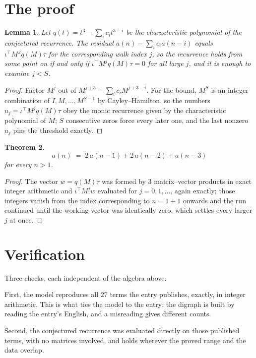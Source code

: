 \documentclass[11pt,a4paper]{article}
\theoremstyle{plain}
\newtheorem{theorem}{Theorem}
\newtheorem{lemma}[theorem]{Lemma}
\theoremstyle{definition}
\begin{document}
\section{The proof}

\begin{lemma}\label{lem:crit}
Let $q(t)=t^{3}-\sum_i c_it^{3-i}$ be the characteristic polynomial of the
conjectured recurrence. The residual $a(n)-\sum_ic_ia(n-i)$ equals
$\iota^{\!\top}M^{\,j}q(M)\tau$ for the corresponding walk index $j$, so the recurrence
holds from some point on if and only if $\iota^{\!\top}M^{j}q(M)\tau=0$ for all large $j$,
and it is enough to examine $j<S$.
\end{lemma}

\begin{proof}
Factor $M^{j}$ out of $M^{j+3}-\sum_ic_iM^{j+3-i}$. For the bound, $M^{S}$
is an integer combination of $I,M,\dots,M^{S-1}$ by Cayley--Hamilton, so the numbers
$u_j=\iota^{\!\top}M^{j}q(M)\tau$ obey the monic recurrence given by the characteristic
polynomial of $M$; $S$ consecutive zeros force every later one, and the last nonzero $u_j$
pins the threshold exactly.
\end{proof}

\begin{theorem}
\[
a(n)\;=\;2\,a(n-1) + 2\,a(n-2) + a(n-3)
\]
for every $n>1$.
\end{theorem}

\begin{proof}
The vector $w=q(M)\tau$ was formed by $3$ matrix--vector products in exact integer
arithmetic and $\iota^{\!\top}M^{j}w$ evaluated for $j=0,1,\dots$, again exactly; those
integers vanish from the index corresponding to $n=1+1$ onwards and the run continued
until the working vector was identically zero, which settles every larger $j$ at once.
\end{proof}

\section{Verification}

Three checks, each independent of the algebra above.

First, the model reproduces all $27$ terms the entry publishes, exactly, in integer
arithmetic. This is what ties the model to the entry: the digraph is built by reading the
entry's English, and a misreading gives different counts.

Second, the conjectured recurrence was evaluated directly on those published terms, with no
matrices involved, and holds wherever the proved range and the data overlap.
\end{document}
